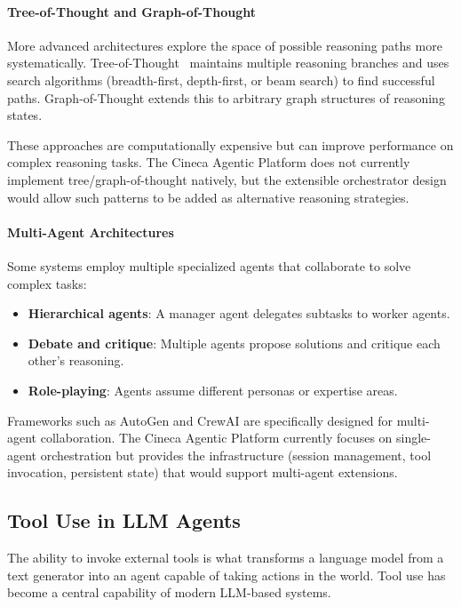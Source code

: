 \documentclass[a4paper,twoside]{sapthesis}
\begin{document}
\paragraph{Tree-of-Thought and Graph-of-Thought}
More advanced architectures explore the space of possible reasoning paths more systematically. Tree-of-Thought~\cite{yao2023tree}
maintains multiple reasoning branches and uses search algorithms (breadth-first, depth-first, or beam search) to find successful paths. Graph-of-Thought extends this to arbitrary graph structures of reasoning states.

These approaches are computationally expensive but can improve performance on complex reasoning tasks. The Cineca Agentic Platform does not currently implement tree/graph-of-thought natively, but the extensible orchestrator design would allow such patterns to be added as alternative reasoning strategies.

\paragraph{Multi-Agent Architectures}
Some systems employ multiple specialized agents that collaborate to solve complex tasks:
\begin{itemize}
    \item \textbf{Hierarchical agents}: A manager agent delegates subtasks to worker agents.
    \item \textbf{Debate and critique}: Multiple agents propose solutions and critique each other's reasoning.
    \item \textbf{Role-playing}: Agents assume different personas or expertise areas.
\end{itemize}

Frameworks such as AutoGen and CrewAI are specifically designed for multi-agent collaboration. The Cineca Agentic Platform currently focuses on single-agent orchestration but provides the infrastructure (session management, tool invocation, persistent state) that would support multi-agent extensions.

\subsection{Tool Use in LLM Agents}

The ability to invoke external tools is what transforms a language model from a text generator into an agent capable of taking actions in the world. Tool use has become a central capability of modern LLM-based systems.
\end{document}
